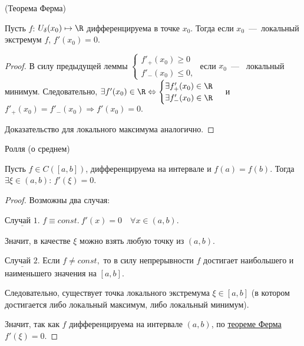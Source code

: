 \begin{theorem}
	\hypertarget{thrm5.9}{(Теорема Ферма)} Пусть $f$: $U_{\delta}(x_{0}) \mapsto \R$ дифференцируема в точке $x_{0}$. Тогда если $x_{0}$~---~локальный экстремум $f$, $f'(x_{0}) = 0$.
\end{theorem}
\begin{proof}
	В силу предыдущей леммы $ \begin{cases}
		f'_{+}(x_{0}) \geq 0 \\
		f'_{-}(x_{0}) \leq 0,
	\end{cases}$
	если $x_{0}$~---~ локальный минимум. Следовательно, $\exists f'(x_{0}) \in \R \Leftrightarrow \begin{cases}
		\exists f'_{+}(x_{0}) \in \R \\
		\exists f'_{-}(x_{0}) \in \R
	\end{cases}$
	и $f'_{+}(x_{0}) = f'_{-}(x_{0}) \Rightarrow f'(x_{0}) = 0.$
	
	Доказательство для локального максимума аналогично.
\end{proof}

\begin{theorem}
	\hypertarget{thrm5.10}{Ролля (о среднем)} Пусть $f \in C([a,b])$, дифференцируема на интервале и $f (a) = f (b)$. Тогда $\exists \xi \in (a, b)$: $f'(\xi) = 0$.
\end{theorem}
\begin{proof}
	Возможны два случая:
	
	$\underline{\textrm{Случай 1.}}$ $f \equiv const. \ f'(x) = 0 \quad \forall x\in (a, b)$.
	
	Значит, в качестве $\xi$ можно взять любую точку из $(a, b)$.
	
	$\underline{\textrm{Случай 2.}}$ Если $f \neq const,$ то в силу непрерывности $f$ достигает наибольшего и наименьшего значения на $[a, b].$
	
	Следовательно, существует точка локального экстремума $\xi \in [a,b]$ (в котором достигается либо локальный максимум, либо локальный минимум).
	
	Значит, так как $f$ дифференцируема на интервале $(a, b)$, по \hyperlink{thrm6.1}{теореме Ферма} $f'(\xi) = 0$.
\end{proof}

